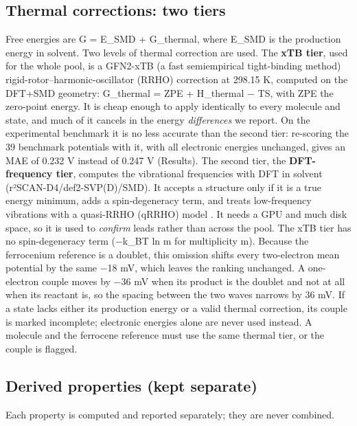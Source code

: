 \documentclass[journal=jcisd8,manuscript=article]{achemso}
\begin{document}
\subsection{Thermal corrections: two tiers}

Free energies are G = E\_SMD + G\_thermal, where E\_SMD is the production energy in solvent. Two levels of thermal correction are used. The \textbf{xTB tier}, used for the whole pool, is a GFN2-xTB (a fast semiempirical tight-binding method) rigid-rotor–harmonic-oscillator (RRHO) correction at 298.15 K, computed on the DFT+SMD geometry: G\_thermal = ZPE + H\_thermal − TS, with ZPE the zero-point energy. It is cheap enough to apply identically to every molecule and state, and much of it cancels in the energy \emph{differences} we report. On the experimental benchmark it is no less accurate than the second tier: re-scoring the 39 benchmark potentials with it, with all electronic energies unchanged, gives an MAE of 0.232 V instead of 0.247 V (Results). The second tier, the \textbf{DFT-frequency tier}, computes the vibrational frequencies with DFT in solvent (r²SCAN-D4/def2-SVP(D)/SMD). It accepts a structure only if it is a true energy minimum, adds a spin-degeneracy term, and treats low-frequency vibrations with a quasi-RRHO (qRRHO) model \cite{grimme2012}. It needs a GPU and much disk space, so it is used to \emph{confirm} leads rather than across the pool. The xTB tier has no spin-degeneracy term (−k\_BT ln m for multiplicity m). Because the ferrocenium reference is a doublet, this omission shifts every two-electron mean potential by the same −18 mV, which leaves the ranking unchanged. A one-electron couple moves by −36 mV when its product is the doublet and not at all when its reactant is, so the spacing between the two waves narrows by 36 mV. If a state lacks either its production energy or a valid thermal correction, its couple is marked incomplete; electronic energies alone are never used instead. A molecule and the ferrocene reference must use the same thermal tier, or the couple is flagged.

\subsection{Derived properties (kept separate)}

Each property is computed and reported separately; they are never combined.
\end{document}

